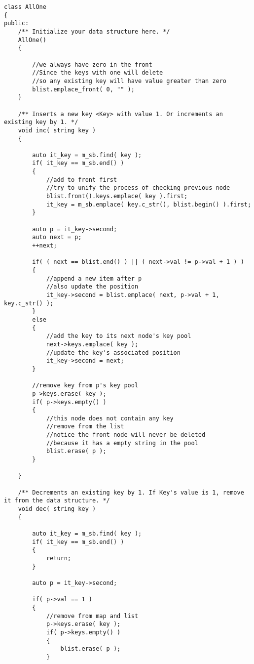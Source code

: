 \setcounter{lstlisting}{0}
\begin{lstlisting}[style=customc, caption={Double Linked List and Iterator For Value In Hash Map}]
class AllOne
{
public:
    /** Initialize your data structure here. */
    AllOne()
    {

        //we always have zero in the front
        //Since the keys with one will delete
        //so any existing key will have value greater than zero
        blist.emplace_front( 0, "" );
    }

    /** Inserts a new key <Key> with value 1. Or increments an existing key by 1. */
    void inc( string key )
    {

        auto it_key = m_sb.find( key );
        if( it_key == m_sb.end() )
        {
            //add to front first
            //try to unify the process of checking previous node
            blist.front().keys.emplace( key ).first;
            it_key = m_sb.emplace( key.c_str(), blist.begin() ).first;
        }

        auto p = it_key->second;
        auto next = p;
        ++next;

        if( ( next == blist.end() ) || ( next->val != p->val + 1 ) )
        {
            //append a new item after p
            //also update the position
            it_key->second = blist.emplace( next, p->val + 1, key.c_str() );
        }
        else
        {
            //add the key to its next node's key pool
            next->keys.emplace( key );
            //update the key's associated position
            it_key->second = next;
        }

        //remove key from p's key pool
        p->keys.erase( key );
        if( p->keys.empty() )
        {
            //this node does not contain any key
            //remove from the list
            //notice the front node will never be deleted
            //because it has a empty string in the pool
            blist.erase( p );
        }

    }

    /** Decrements an existing key by 1. If Key's value is 1, remove it from the data structure. */
    void dec( string key )
    {

        auto it_key = m_sb.find( key );
        if( it_key == m_sb.end() )
        {
            return;
        }

        auto p = it_key->second;

        if( p->val == 1 )
        {
            //remove from map and list
            p->keys.erase( key );
            if( p->keys.empty() )
            {
                blist.erase( p );
            }


\end{lstlisting}
